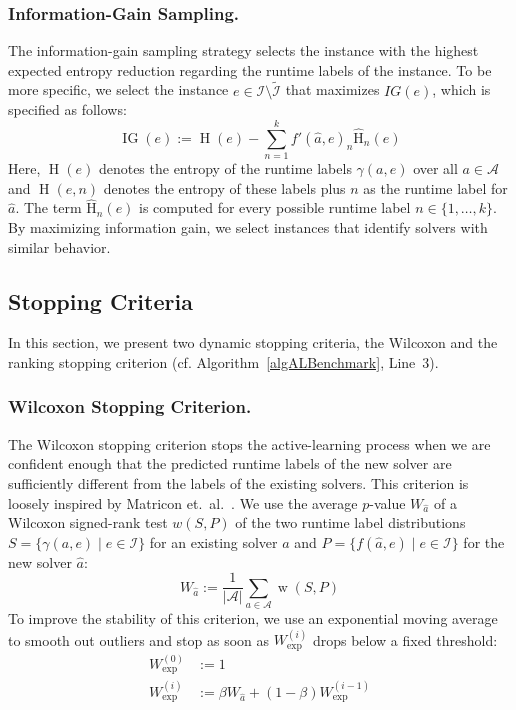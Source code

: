 \documentclass[runningheads]{llncs}
\begin{document}
\subsubsection{Information-Gain Sampling.}

The information-gain sampling strategy selects the instance with the highest expected entropy reduction regarding the runtime labels of the instance.
To be more specific, we select the instance $e \in \mathcal{I} \setminus \tilde{\mathcal{I}}$ that maximizes $IG(e)$, which is specified as follows:
%
\begin{equation*}
  \operatorname{IG}(e) := \operatorname{H}(e) - \sum_{n = 1}^{k} f'(\hat{a}, e)_{n} \operatorname{\hat H}_n(e)
\end{equation*}
%
Here, $\operatorname{H}(e)$ denotes the entropy of the runtime labels $\gamma(a, e)$ over all $a \in \mathcal{A}$ and $\operatorname{H}(e, n)$ denotes the entropy of these labels plus $n$ as the runtime label for $\hat{a}$.
The term $\operatorname{\hat H}_n(e)$ is computed for every possible runtime label $n \in \{1, \dots, k\}$.
By maximizing information gain, we select instances that identify solvers with similar behavior.

\subsection{Stopping Criteria}
\label{sec:main:stopping}

In this section, we present two dynamic stopping criteria, the Wilcoxon and the ranking stopping criterion (cf. Algorithm~\ref{algALBenchmark}, Line~3).

\subsubsection{Wilcoxon Stopping Criterion.}

The Wilcoxon stopping criterion stops the active-learning process when we are confident enough that the predicted runtime labels of the new solver are sufficiently different from the labels of the existing solvers.
This criterion is loosely inspired by Matricon et.~al.~\cite{MatriconAFSH21}.
We use the average $p$-value $W_{\hat{a}}$ of a Wilcoxon signed-rank test $w(S,P)$ of the two runtime label distributions $S=\{ \gamma(a, e) \mid e \in \mathcal{I} \}$ for an existing solver $a$ and \mbox{$P=\{ f(\hat a, e) \mid e \in \mathcal{I} \}$} for the new solver $\hat{a}$:
%
\begin{equation*}
  W_{\hat{a}} := \frac{1}{\lvert \mathcal{A} \rvert} \sum_{a \in \mathcal{A}} \operatorname{w}(S, P)
\end{equation*}
%
To improve the stability of this criterion, we use an exponential moving average to smooth out outliers and stop as soon as $W^{(i)}_{\exp}$ drops below a fixed threshold:
%
\begin{align*}
  W_{\exp}^{\left(0\right)} &:= 1\\
  W_{\exp}^{\left(i\right)} &:= \beta W_{\hat{a}} + \left(1 - \beta\right) W_{\exp}^{\left(i - 1\right)}
\end{align*}
\end{document}
